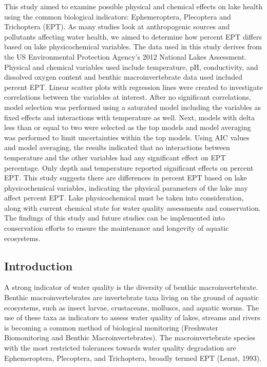 \documentclass[]{article}
\begin{document}
This study aimed to examine possible physical and chemical effects on
lake health using the common biological indicators: Ephemeroptera,
Plecoptera and Trichoptera (EPT). As many studies look at anthropogenic
sources and pollutants affecting water health, we aimed to determine how
percent EPT differs based on lake physicochemical variables. The data
used in this study derives from the US Environmental Protection Agency's
2012 National Lakes Assessment. Physical and chemical variables used
include temperature, pH, conductivity, and dissolved oxygen content and
benthic macroinvertebrate data used included percent EPT. Linear scatter
plots with regression lines were created to investigate correlations
between the variables at interest. After no significant correlations,
model selection was performed using a saturated model including the
variables as fixed effects and interactions with temperature as well.
Next, models with delta less than or equal to two were selected as the
top models and model averaging was performed to limit uncertainties
within the top models. Using AIC values and model averaging, the results
indicated that no interactions between temperature and the other
variables had any significant effect on EPT percentage. Only depth and
temperature reported significant effects on percent EPT. This study
suggests there are differences in percent EPT based on lake
physicochemical variables, indicating the physical parameters of the
lake may affect percent EPT. Lake physicochemical must be taken into
consideration, along with current chemical state for water quality
assessments and conservation. The findings of this study and future
studies can be implemented into conservation efforts to ensure the
maintenance and longevity of aquatic ecosystems.

\subsection{Introduction}\label{introduction}

A strong indicator of water quality is the diversity of benthic
macroinvertebrate. Benthic macroinvertebrates are invertebrate taxa
living on the ground of aquatic ecosystems, such as insect larvae,
crustaceans, molluscs, and aquatic worms. The use of these taxa as
indicators to assess water quality of lakes, streams and rivers is
becoming a common method of biological monitoring (Freshwater
Biomonitoring and Benthic Macroinvertebrates). The macroinvertebrate
species with the most restricted tolerances towards water quality
degradation are Ephemeroptera, Plecoptera, and Trichoptera, broadly
termed EPT (Lenat, 1993).
\end{document}
